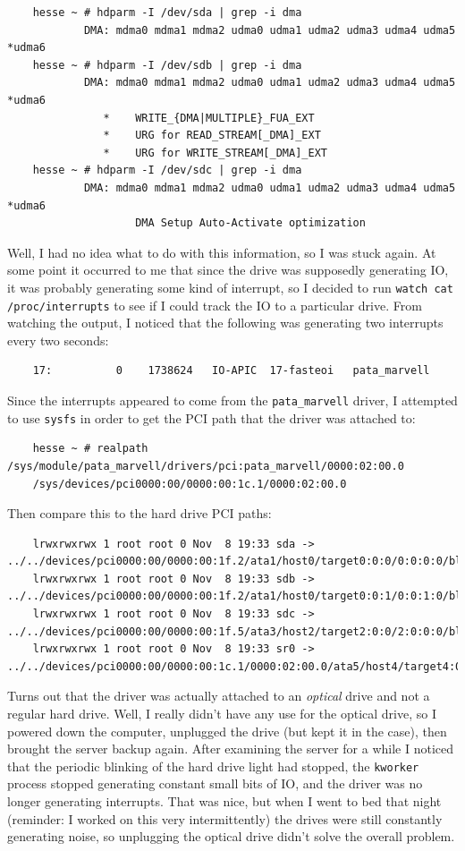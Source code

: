 \documentclass{article}
\begin{document}
\begin{verbatim}
	hesse ~ # hdparm -I /dev/sda | grep -i dma
	        DMA: mdma0 mdma1 mdma2 udma0 udma1 udma2 udma3 udma4 udma5 *udma6
	hesse ~ # hdparm -I /dev/sdb | grep -i dma
	        DMA: mdma0 mdma1 mdma2 udma0 udma1 udma2 udma3 udma4 udma5 *udma6
	           *    WRITE_{DMA|MULTIPLE}_FUA_EXT
	           *    URG for READ_STREAM[_DMA]_EXT
	           *    URG for WRITE_STREAM[_DMA]_EXT
	hesse ~ # hdparm -I /dev/sdc | grep -i dma
	        DMA: mdma0 mdma1 mdma2 udma0 udma1 udma2 udma3 udma4 udma5 *udma6
	                DMA Setup Auto-Activate optimization
\end{verbatim}
Well, I had no idea what to do with this information, so I was stuck again.  At some point it occurred to me that since the drive was supposedly generating IO, it was probably generating some kind of interrupt, so I decided to run \texttt{watch cat /proc/interrupts} to see if I could track the IO to a particular drive.  From watching the output, I noticed that the following was generating two interrupts every two seconds:
\begin{verbatim}
	17:          0    1738624   IO-APIC  17-fasteoi   pata_marvell
\end{verbatim}
Since the interrupts appeared to come from the \texttt{pata_marvell} driver, I attempted to use \texttt{sysfs} in order to get the PCI path that the driver was attached to:
\begin{verbatim}
	hesse ~ # realpath /sys/module/pata_marvell/drivers/pci:pata_marvell/0000:02:00.0
	/sys/devices/pci0000:00/0000:00:1c.1/0000:02:00.0
\end{verbatim}
Then compare this to the hard drive PCI paths:
\begin{verbatim}
	lrwxrwxrwx 1 root root 0 Nov  8 19:33 sda -> ../../devices/pci0000:00/0000:00:1f.2/ata1/host0/target0:0:0/0:0:0:0/block/sda
	lrwxrwxrwx 1 root root 0 Nov  8 19:33 sdb -> ../../devices/pci0000:00/0000:00:1f.2/ata1/host0/target0:0:1/0:0:1:0/block/sdb
	lrwxrwxrwx 1 root root 0 Nov  8 19:33 sdc -> ../../devices/pci0000:00/0000:00:1f.5/ata3/host2/target2:0:0/2:0:0:0/block/sdc
	lrwxrwxrwx 1 root root 0 Nov  8 19:33 sr0 -> ../../devices/pci0000:00/0000:00:1c.1/0000:02:00.0/ata5/host4/target4:0:0/4:0:0:0/block/sr0
\end{verbatim}
Turns out that the driver was actually attached to an \emph{optical} drive and not a regular hard drive.  Well, I really didn't have any use for the optical drive, so I powered down the computer, unplugged the drive (but kept it in the case), then brought the server backup again.  After examining the server for a while I noticed that the periodic blinking of the hard drive light had stopped, the \texttt{kworker} process stopped generating constant small bits of IO, and the driver was no longer generating interrupts.  That was nice, but when I went to bed that night (reminder: I worked on this very intermittently) the drives were still constantly generating noise, so unplugging the optical drive didn't solve the overall problem.
\end{document}
